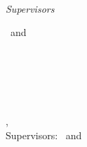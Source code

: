 \begin{titlepage}
	\vfill
	{\large \thesisSubject} \\[5mm]
	{\LARGE \color{ctcolortitle}\textbf{\thesisTitle} \\[10mm]}
	{\Large \thesisName} \\

	\vfill
	\begin{minipage}[t]{.27\textwidth}
		\raggedleft
		\textit{Supervisors}
	\end{minipage}
	\hspace*{15pt}
	\begin{minipage}[t]{.65\textwidth}
		\thesisFirstSupervisor\ and \thesisSecondSupervisor
	\end{minipage} \\[10mm]

	\thesisDate\\
	

\end{titlepage}






\hfill
\vfill
{
	\small
	\textbf{\thesisName} \\
	\textit{\thesisTitle} \\
	\thesisSubject, \thesisDate \\
	Supervisors: \thesisFirstSupervisor\ and \thesisSecondSupervisor \\[1.5em]
	\textbf{\thesisUniversity} \\
	\thesisUniversityDepartment \\
	\thesisUniversityInstitute \\
	\textit{\thesisUniversityGroup} \\
	\thesisUniversityStreetAddress \\
	\thesisUniversityPostalCode\ 
} 
